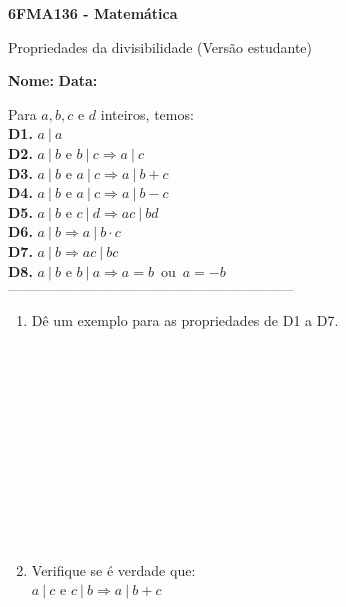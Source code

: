 \documentclass[a4paper,14pt]{article}
\begin{document}
	
	\noindent\textbf{6FMA136 - Matemática} 
	
	\begin{center}Propriedades da divisibilidade (Versão estudante)
	\end{center}
	
	\noindent\textbf{Nome:} \underline{\hspace{10cm}}
	\noindent\textbf{Data:} \underline{\hspace{4cm}}
	
	
	\begin{multicols}{2}
	    \noindent Para $a, b, c$ e $d$ inteiros, temos: \\
	    \textbf{D1.} $ a~|~a$ \\
	    \textbf{D2.} $ a~|~b$ e $b~|~c \Rightarrow a~|~c$ \\
	    \textbf{D3.} $ a~|~b$ e $a~|~c \Rightarrow a~|~b + c$ \\
	    \textbf{D4.} $ a~|~b$ e $a~|~c \Rightarrow a~|~b - c$ \\
	    \textbf{D5.} $ a~|~b$ e $c~|~d \Rightarrow ac~|~bd$ \\
	    \textbf{D6.} $ a~|~b \Rightarrow a~|~b \cdot c$ \\
	    \textbf{D7.} $ a~|~b \Rightarrow ac~|~bc$ \\
	    \textbf{D8.} $ a~|~b$ e $b~|~a \Rightarrow a = b$~ou~$a = -b$ \\
		\noindent\textsubscript{--------------------------------------------------------------------------}
		\begin{enumerate} 
			\item Dê um exemplo para as propriedades de D1 a D7. \\\\\\\\\\\\\\\\\\\\\\\\
			\item Verifique se é verdade que: \\
			$a~|~c$ e $c~|~b \Rightarrow a~|~b + c$ \\\\\\\\\\\\\\\\

\end{enumerate}
\end{multicols}
\end{document}
